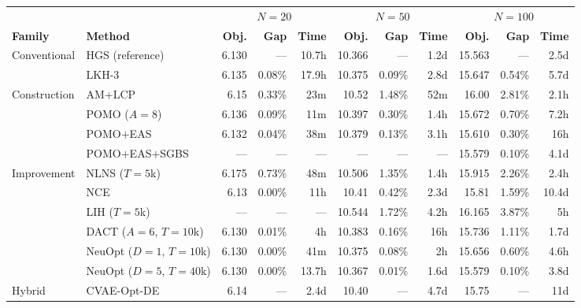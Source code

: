 \documentclass[letterpaper]{article} %
\begin{document}
\begin{table}[t]
\centering
\footnotesize
\setlength{\tabcolsep}{4pt}
\begin{tabular}{@{}ll rrr rrr rrr@{}}
\toprule
& & \multicolumn{3}{c}{$N=20$} & \multicolumn{3}{c}{$N=50$} & \multicolumn{3}{c}{$N=100$} \\
\cmidrule(lr){3-5} \cmidrule(lr){6-8} \cmidrule(lr){9-11}
\textbf{Family} & \textbf{Method} & \textbf{Obj.} & \textbf{Gap} & \textbf{Time} & \textbf{Obj.} & \textbf{Gap} & \textbf{Time} & \textbf{Obj.} & \textbf{Gap} & \textbf{Time} \\
\midrule
\multirow{2}{*}{Conventional}
 & HGS (reference)                & 6.130 & ---    & 10.7h & 10.366 & ---    & 1.2d & 15.563 & ---    & 2.5d \\
 & LKH-3                          & 6.135 & 0.08\% & 17.9h & 10.375 & 0.09\% & 2.8d & 15.647 & 0.54\% & 5.7d \\
\midrule
\multirow{4}{*}{Construction}
 & AM+LCP\rlap{$^{\ddagger}$}     & 6.15 & 0.33\% & 23m & 10.52 & 1.48\% & 52m & 16.00 & 2.81\% & 2.1h \\
 & POMO ($A{=}8$)                 & 6.136 & 0.09\% & 11m & 10.397 & 0.30\% & 1.4h & 15.672 & 0.70\% & 7.2h \\
 & POMO$+$EAS                     & 6.132 & 0.04\% & 38m & 10.379 & 0.13\% & 3.1h & 15.610 & 0.30\% & 16h \\
 & POMO$+$EAS$+$SGBS              & ---   & ---    & --- & ---    & ---    & ---  & 15.579 & 0.10\% & 4.1d \\
\midrule
\multirow{6}{*}{Improvement}
 & NLNS ($T{=}5$k)                & 6.175 & 0.73\% & 48m & 10.506 & 1.35\% & 1.4h & 15.915 & 2.26\% & 2.4h \\
 & NCE\rlap{$^{\ddagger}$}        & 6.13 & 0.00\% & 11h & 10.41 & 0.42\% & 2.3d & 15.81 & 1.59\% & 10.4d \\
 & LIH ($T{=}5$k)                 & ---   & ---    & --- & 10.544 & 1.72\% & 4.2h & 16.165 & 3.87\% & 5h \\
 & DACT ($A{=}6$, $T{=}10$k)      & 6.130 & 0.01\% & 4h  & 10.383 & 0.16\% & 16h  & 15.736 & 1.11\% & 1.7d \\
 & NeuOpt ($D{=}1$, $T{=}10$k)    & 6.130 & 0.00\% & 41m & 10.375 & 0.08\% & 2h   & 15.656 & 0.60\% & 4.6h \\
 & NeuOpt ($D{=}5$, $T{=}40$k)    & 6.130 & 0.00\% & 13.7h & 10.367 & 0.01\% & 1.6d & 15.579 & 0.10\% & 3.8d \\
\midrule
\multirow{2}{*}{Hybrid}
 & CVAE-Opt-DE\rlap{$^{\ddagger}$} & 6.14 & --- & 2.4d & 10.40 & --- & 4.7d & 15.75 & --- & 11d \\

\end{tabular}
\end{table}
\end{document}
